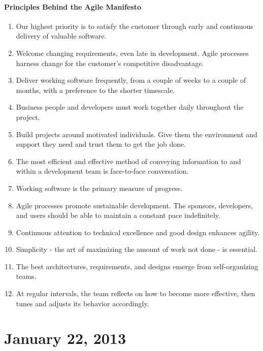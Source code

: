 \documentclass{report}
\begin{document}
				\subsubsection{Principles Behind the Agile Manifesto}
					\begin{enumerate}
						\item Our highest priority is to satisfy the customer through early and continuous delivery of valuable software.
						\item Welcome changing requirements, even late in development. Agile processes harness change for the customer's competitive disadvantage.
						\item Deliver working software frequently, from a couple of weeks to a couple of months, with a preference to the shorter timescale.
						\item Business people and developers must work together daily throughout the project.
						\item Build projects around motivated individuals. Give them the environment and support they need and trust them to get the job done.
						\item The most efficient and effective method of conveying information to and within a development team is face-to-face conversation.
						\item Working software is the primary measure of progress.
						\item Agile processes promote sustainable development. The sponsors, developers, and users should be able to maintain a constant pace indefinitely.
						\item Continuous attention to technical excellence and good design enhances agility.
						\item Simplicity - the art of maximizing the amount of  work not done - is essential.
						\item The best architectures, requirements, and designs emerge from self-organizing teams.
						\item At regular intervals, the team reflects on how to become more effective, then tunes and adjusts its behavior accordingly.
					\end{enumerate}
	\chapter{January 22, 2013}
\end{document}
